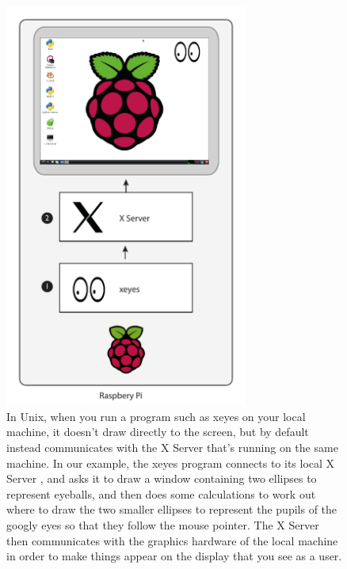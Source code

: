 \begin{figure}
\centerline{\includegraphics[width=8cm]{images/x-on-pi}}
\caption{In Unix, when you run a program such as xeyes on your local machine, it doesn't draw directly to the screen, but by default instead communicates with the X Server that's running on the same machine. In our example, the xeyes program \protect{} connects to its local X Server \protect{}, and asks it to draw a window containing two ellipses to represent eyeballs, and then does some calculations to work out where to draw the two smaller ellipses to represent the pupils of the googly eyes so that they follow the mouse pointer. The X Server then communicates with the graphics hardware of the local machine in order to make things appear on the display that you see as a user. }\label{figure:x-on-pi}
\end{figure}

